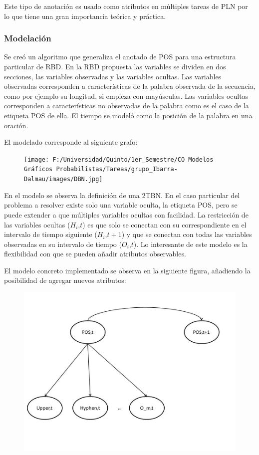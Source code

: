 \documentclass[]{article}
\begin{document}
Este tipo de anotación es usado como atributos en múltiples tareas de
PLN por lo que tiene una gran importancia teórica y práctica.

\subsubsection{Modelación}\label{header-n133}

Se creó un algoritmo que generaliza el anotado de POS para una
estructura particular de RBD. En la RBD propuesta las variables se
dividen en dos secciones, las variables observadas y las variables
ocultas. Las variables observadas corresponden a características de la
palabra observada de la secuencia, como por ejemplo su longitud, si
empieza con mayúsculas. Las variables ocultas corresponden a
características no observadas de la palabra como es el caso de la
etiqueta POS de ella. El tiempo se modeló como la posición de la palabra
en una oración.

El modelado corresponde al siguiente grafo:

\begin{figure}
\centering
\texttt{[image: F:/Universidad/Quinto/1er\_Semestre/CO Modelos Gráficos Probabilistas/Tareas/grupo\_Ibarra-Dalmau/images/DBN.jpg]}
\caption{}
\end{figure}

En el modelo se observa la definición de una 2TBN. En el caso particular
del problema a resolver existe solo una variable oculta, la etiqueta
POS, pero se puede extender a que múltiples variables ocultas con
facilidad. La restricción de las variables ocultas ($H_i$,$t$)
es que solo se conectan con su correspondiente en el intervalo de tiempo
siguiente ($H_i$,$t+1$) y que se conectan con todas las variables
observadas en su intervalo de tiempo ($O_i$,$t$). Lo interesante de
este modelo es la flexibilidad con que se pueden añadir atributos
observables.

El modelo concreto implementado se observa en la siguiente figura,
añadiendo la posibilidad de agregar nuevos atributos:

\begin{figure}
\centering
\includegraphics{images/DBN_POS.jpg}
\caption{}
\end{figure}
\end{document}
